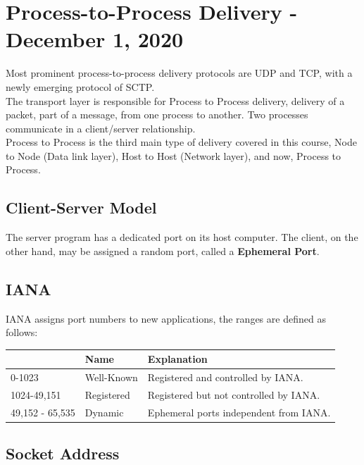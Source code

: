 \documentclass[11pt,a4paper,twoside]{book}
\begin{document}
\chapter{Process-to-Process Delivery - December 1, 2020}

Most prominent process-to-process delivery protocols are UDP and TCP, with a newly emerging protocol of SCTP.\\

The transport layer is responsible for Process to Process delivery, delivery of a packet, part of a message, from one process to another. Two processes communicate in a client/server relationship.\\

Process to Process is the third main type of delivery covered in this course, Node to Node (Data link layer), Host to Host (Network layer), and now, Process to Process.

\section{Client-Server Model}

The server program has a dedicated port on its host computer. The client, on the other hand, may be assigned a random port, called a \textbf{Ephemeral Port}.

\section{IANA}

IANA assigns port numbers to new applications, the ranges are defined as follows:

\begin{table}
\begin{tabular}{lll}
\toprule
& Name & Explanation \\
\midrule
0-1023 & Well-Known & Registered and controlled by IANA. \\
1024-49,151 & Registered & Registered but not controlled by IANA. \\ 
49,152 - 65,535 & Dynamic & Ephemeral ports independent from IANA. \\
\bottomrule
\end{tabular}
\end{table}

\section{Socket Address}
\end{document}
